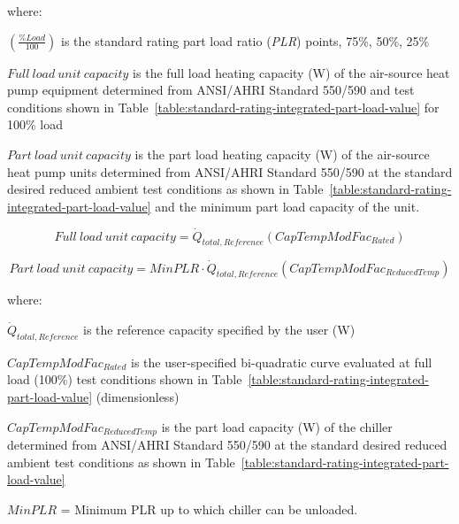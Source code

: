 where:

\emph{\(\left( {\frac{{\% Load}}{{100}}} \right)\)} is the standard rating part load ratio (\emph{PLR}) points, 75\%, 50\%, 25\%

\(Full~load~unit~capacity\) is the full load heating capacity (W) of the air-source heat pump equipment determined from ANSI/AHRI Standard 550/590 and test conditions shown in Table~\ref{table:standard-rating-integrated-part-load-value} for 100\% load

\(Part~load~unit~capacity\) is the part load heating capacity (W) of the air-source heat pump units determined from ANSI/AHRI Standard 550/590 at the standard desired reduced ambient test conditions as shown in Table~\ref{table:standard-rating-integrated-part-load-value} and the minimum part load capacity of the unit.

\begin{equation}
Full~load~unit~capacity = {\dot Q_{total,Reference}}\left( {CapTempModFa{c_{Rated}}} \right)
\end{equation}

\begin{equation}
Part~load~unit~capacity = MinPLR \cdot {\dot Q_{total,Reference}}\left( {CapTempModFa{c_{ReducedTemp}}} \right)
\end{equation}

where:

\({\dot Q_{total,Reference}}\) is the reference capacity specified by the user (W)

\(CapTempModFa{c_{Rated}}\) is the user-specified bi-quadratic curve evaluated at full load (100\%) test conditions shown in Table~\ref{table:standard-rating-integrated-part-load-value} (dimensionless)

\(CapTempModFa{c_{ReducedTemp}}\) is the part load capacity (W) of the chiller determined from ANSI/AHRI Standard 550/590 at the standard desired reduced ambient test conditions as shown in Table~\ref{table:standard-rating-integrated-part-load-value}

\(MinPLR\) = Minimum PLR up to which chiller can be unloaded.

